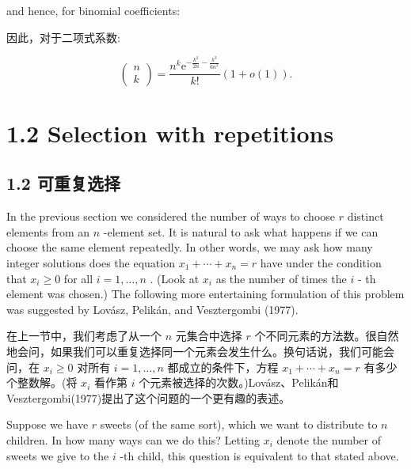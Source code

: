 \documentclass[10pt]{article}
\begin{document}
and hence, for binomial coefficients:

\begin{tcolorbox}\relax
因此，对于二项式系数:
\end{tcolorbox}

\[
\left( \begin{array}{l} n \\  k \end{array}\right)  = \frac{{n}^{k}{\mathrm{e}}^{-\frac{{k}^{2}}{2n} - \frac{{k}^{3}}{6{n}^{2}}}}{k!}\left( {1 + o\left( 1\right) }\right) . \tag{1.9}
\]

\section*{1.2 Selection with repetitions}

\begin{tcolorbox}\relax
\section*{1.2 可重复选择}
\end{tcolorbox}

In the previous section we considered the number of ways to choose \(r\) distinct elements from an \(n\) -element set. It is natural to ask what happens if we can choose the same element repeatedly. In other words, we may ask how many integer solutions does the equation \({x}_{1} + \cdots  + {x}_{n} = r\) have under the condition that \({x}_{i} \geq  0\) for all \(i = 1,\ldots ,n\) . (Look at \({x}_{i}\) as the number of times the \(i\) - th element was chosen.) The following more entertaining formulation of this problem was suggested by Lovász, Pelikán, and Vesztergombi (1977).

\begin{tcolorbox}\relax
在上一节中，我们考虑了从一个 \(n\) 元集合中选择 \(r\) 个不同元素的方法数。很自然地会问，如果我们可以重复选择同一个元素会发生什么。换句话说，我们可能会问，在 \({x}_{i} \geq  0\) 对所有 \(i = 1,\ldots ,n\) 都成立的条件下，方程 \({x}_{1} + \cdots  + {x}_{n} = r\) 有多少个整数解。(将 \({x}_{i}\) 看作第 \(i\) 个元素被选择的次数。)Lovász、Pelikán和Vesztergombi(1977)提出了这个问题的一个更有趣的表述。
\end{tcolorbox}

Suppose we have \(r\) sweets (of the same sort), which we want to distribute to \(n\) children. In how many ways can we do this? Letting \({x}_{i}\) denote the number of sweets we give to the \(i\) -th child, this question is equivalent to that stated above.
\end{document}

